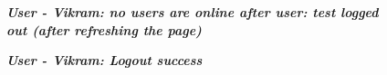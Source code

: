 \begin{figure}[htp]
    \centering
    \caption{\textbf{\textit{ User - Vikram: no users are online after user: test logged out (after refreshing the page) }}}
    \label{fig:vikram-session-after-test-logout}
\end{figure}

\begin{figure}[htp]
    \centering
    \caption{\textbf{\textit{User - Vikram: Logout success}}}
    \label{fig:vikram-logout-success}
\end{figure}

